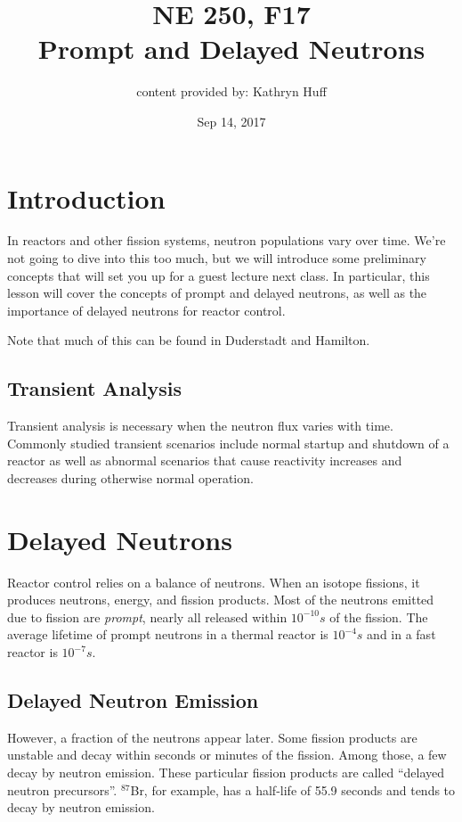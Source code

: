 \documentclass[12pt]{article}
\title{NE 250, F17 \\
Prompt and Delayed Neutrons}
\date{Sep 14, 2017}
\begin{document}
\author{content provided by: Kathryn Huff}
\maketitle

\hrulefill

\section{Introduction}

In reactors and other fission systems, neutron populations vary over time. We're not going to dive into this too much, but we will introduce some preliminary concepts that will set you up for a guest lecture next class.
In particular, this lesson will 
cover the concepts of prompt and delayed neutrons, as well as the importance of delayed neutrons for reactor control. 

Note that much of this can be found in Duderstadt and Hamilton.

\subsection{Transient Analysis}

Transient analysis is necessary when the neutron flux varies with time.
Commonly studied transient scenarios include normal startup and shutdown of a
reactor as well as abnormal scenarios that cause reactivity increases and
decreases during otherwise normal operation.

\section{Delayed Neutrons}
Reactor control relies on a balance of neutrons. When an isotope fissions, it 
produces neutrons, energy, and fission products.  Most of the neutrons emitted 
due to fission are \emph{prompt}, nearly all released within $10^{-10}s$ of the fission. 
The average lifetime of prompt neutrons in a thermal reactor is $10^{-4}s$ and in a fast
reactor is $10^{-7}s$. 

\subsection{Delayed Neutron Emission}
However, a fraction of the neutrons appear later. Some fission products are 
unstable and decay within seconds or minutes of the fission. Among those, a few 
decay by neutron emission. These particular fission products are called ``delayed 
neutron precursors''.  $^{87}$Br, for example, has a half-life of 55.9 seconds 
and tends to decay by neutron emission.
\end{document}
